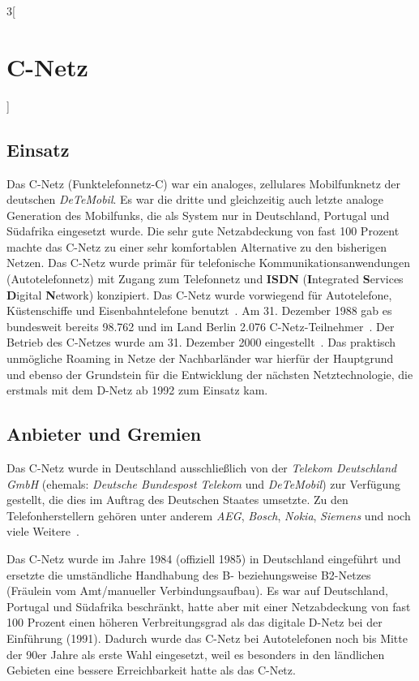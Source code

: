 \begin{multicols}{3}[\section{C-Netz}]
\subsection*{Einsatz}
Das C-Netz (Funktelefonnetz-C) war ein analoges, zellulares Mobilfunknetz der deutschen \textit{DeTeMobil}. Es war die dritte und gleichzeitig auch letzte analoge Generation des Mobilfunks, die als System nur in Deutschland, Portugal und Südafrika eingesetzt wurde. Die sehr gute Netzabdeckung von fast 100 Prozent machte das C-Netz zu einer sehr komfortablen Alternative zu den bisherigen Netzen. Das C-Netz wurde primär für telefonische Kommunikationsanwendungen (Autotelefonnetz) mit Zugang zum Telefonnetz und \textbf{ISDN} (\textbf{I}ntegrated \textbf{S}ervices \textbf{D}igital \textbf{N}etwork) konzipiert. Das C-Netz wurde vorwiegend für Autotelefone, Küstenschiffe und Eisenbahntelefone benutzt~\cite{c-netz.1}.
Am 31. Dezember 1988 gab es bundesweit bereits 98.762 und im Land Berlin 2.076 C-Netz-Teilnehmer~\cite{c-netz.3}.
Der Betrieb des C-Netzes wurde am 31. Dezember 2000 eingestellt~\cite{c-netz.6}. Das praktisch unmögliche Roaming in Netze der Nachbarländer war hierfür der Hauptgrund und ebenso der Grundstein für die Entwicklung der nächsten Netztechnologie, die erstmals mit dem D-Netz ab 1992 zum Einsatz kam.




\subsection*{Anbieter und Gremien}
Das C-Netz wurde in Deutschland ausschließlich von der \textit{Telekom Deutschland GmbH} (ehemals: \textit{Deutsche Bundespost Telekom} und \textit{DeTeMobil}) zur Verfügung gestellt, die dies im Auftrag des Deutschen Staates umsetzte. Zu den Telefonherstellern gehören unter anderem \textit{AEG}, \textit{Bosch}, \textit{Nokia}, \textit{Siemens} und noch viele Weitere~\cite{c-netz.5}.

Das C-Netz wurde im Jahre 1984 (offiziell 1985) in Deutschland eingeführt und ersetzte die umständliche Handhabung des B- beziehungsweise B2-Netzes (Fräulein vom Amt/manueller Verbindungsaufbau). Es war auf Deutschland, Portugal und Südafrika beschränkt, hatte aber mit einer Netzabdeckung von fast 100 Prozent einen höheren Verbreitungsgrad als das digitale D-Netz bei der Einführung (1991). Dadurch wurde das C-Netz bei Autotelefonen noch bis Mitte der 90er Jahre als erste Wahl eingesetzt, weil es besonders in den ländlichen Gebieten eine bessere Erreichbarkeit hatte als das C-Netz. 


\end{multicols}
\newpage
